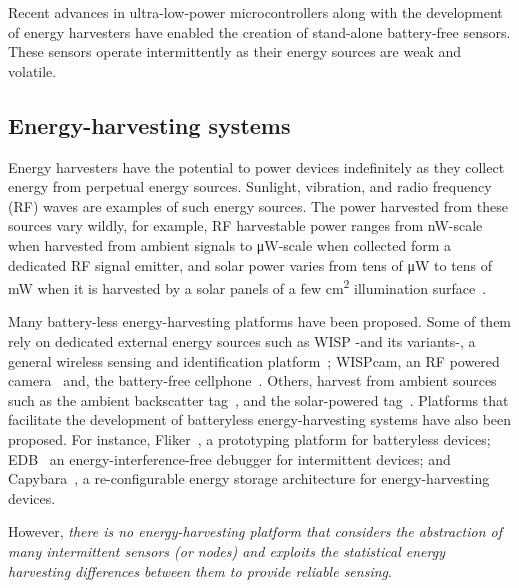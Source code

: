 Recent advances in ultra-low-power microcontrollers along with the development of energy harvesters have enabled the creation of stand-alone battery-free sensors. These sensors operate intermittently as their energy sources are weak and volatile.
%
\subsection{Energy-harvesting systems}
Energy harvesters have the potential to power devices indefinitely as they collect energy from perpetual energy sources. Sunlight, vibration, and radio frequency (RF) waves are examples of such energy sources. The power harvested from these sources vary wildly, for example, RF harvestable power ranges from
\si{\nano\watt}-scale when harvested from ambient signals to \si{\uW}-scale when collected form a dedicated RF signal emitter, and solar power varies from tens of \si{\uW} to tens of \si{\mW} when it is harvested by a solar panels of a few \si{\cm^2} illumination surface~\cite{lucia2017intermittent,rao2017ambient}.

Many battery-less energy-harvesting platforms have been proposed. Some of them rely on dedicated external energy sources such as WISP -and its variants-, a general wireless sensing and identification platform~\cite{smith2006wirelessly,zhao2015nfc,zhang2011moo}; WISPcam,  an RF powered camera~\cite{naderiparizi2015wispcam} and, the battery-free cellphone~\cite{talla2017battery}. Others, harvest from ambient sources such as the ambient backscatter tag~\cite{liu2013ambient}, and the solar-powered tag~\cite{majid2019multi}. Platforms that facilitate the development of batteryless energy-harvesting systems have also been proposed. For instance, Fliker~\cite{hester2017flicker}, a prototyping platform for batteryless devices; EDB~\cite{colin2016energy} an energy-interference-free debugger for intermittent devices;  and Capybara~\cite{colin2018reconfigurable}, a re-configurable energy storage architecture for energy-harvesting devices.

However, \emph{there is no energy-harvesting platform that considers the abstraction of many intermittent sensors (or nodes) and exploits the statistical energy harvesting differences between them to provide reliable sensing}.

